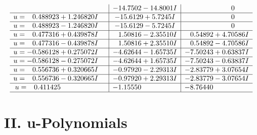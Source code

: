 \documentclass[1p]{elsarticle_modified}
\theoremstyle{definition}
\begin{document}
$$\begin{array}{c|c|c}
 & -14.7502 - 14.8001 I & \phantom{-0.000000 } 0 \\ \hline\begin{aligned}
u &= \phantom{-}0.488923 + 1.246820 I\end{aligned}
 & -15.6129 + 5.7245 I & \phantom{-0.000000 } 0 \\ \hline\begin{aligned}
u &= \phantom{-}0.488923 - 1.246820 I\end{aligned}
 & -15.6129 - 5.7245 I & \phantom{-0.000000 } 0 \\ \hline\begin{aligned}
u &= \phantom{-}0.477316 + 0.439878 I\end{aligned}
 & \phantom{-}1.50816 - 2.35510 I & \phantom{-}0.54892 + 4.70586 I \\ \hline\begin{aligned}
u &= \phantom{-}0.477316 - 0.439878 I\end{aligned}
 & \phantom{-}1.50816 + 2.35510 I & \phantom{-}0.54892 - 4.70586 I \\ \hline\begin{aligned}
u &= -0.586128 + 0.275072 I\end{aligned}
 & -4.62644 - 1.65735 I & -7.50243 + 0.63837 I \\ \hline\begin{aligned}
u &= -0.586128 - 0.275072 I\end{aligned}
 & -4.62644 + 1.65735 I & -7.50243 - 0.63837 I \\ \hline\begin{aligned}
u &= \phantom{-}0.556736 + 0.320665 I\end{aligned}
 & -0.97920 - 2.29313 I & -2.83779 + 3.07654 I \\ \hline\begin{aligned}
u &= \phantom{-}0.556736 - 0.320665 I\end{aligned}
 & -0.97920 + 2.29313 I & -2.83779 - 3.07654 I \\ \hline\begin{aligned}
u &= \phantom{-}0.411425\phantom{ +0.000000I}\end{aligned}
 & -1.15550\phantom{ +0.000000I} & -8.76440\phantom{ +0.000000I}\\
 \hline 
 \end{array}$$\newpage
\newpage\renewcommand{\arraystretch}{1}
\centering \section*{ II. u-Polynomials}
\end{document}
